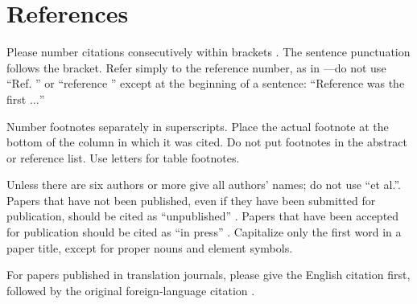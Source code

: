 \documentclass[conference]{IEEEtran}
\begin{document}
\section*{References}

Please number citations consecutively within brackets . The 
sentence punctuation follows the bracket. Refer simply to the reference 
number, as in \cite{b3}---do not use ``Ref. \cite{b3}'' or ``reference \cite{b3}'' except at 
the beginning of a sentence: ``Reference \cite{b3} was the first $\ldots$''

Number footnotes separately in superscripts. Place the actual footnote at 
the bottom of the column in which it was cited. Do not put footnotes in the 
abstract or reference list. Use letters for table footnotes.

Unless there are six authors or more give all authors' names; do not use 
``et al.''. Papers that have not been published, even if they have been 
submitted for publication, should be cited as ``unpublished'' \cite{b4}. Papers 
that have been accepted for publication should be cited as ``in press'' \cite{b5}. 
Capitalize only the first word in a paper title, except for proper nouns and 
element symbols.

For papers published in translation journals, please give the English 
citation first, followed by the original foreign-language citation \cite{b6}.
\end{document}
